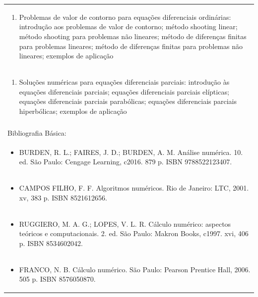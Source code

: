\documentclass[11pt]{article}
\begin{document}
\begin{center}
\begin{longtable}{|p{4cm}|p{4cm}|p{4cm}|p{4cm}|}
\multicolumn{4}{|p{\dimexpr 16cm + 6\tabcolsep\relax}|}{\begin{enumerate}[start=2]\item Problemas de valor de contorno para equações diferenciais ordinárias: introdução aos problemas de valor de contorno; método shooting linear; método shooting para problemas não lineares; método de diferenças finitas para problemas lineares; método de diferenças finitas para problemas não lineares; exemplos de aplicação\end{enumerate}}\\
\multicolumn{4}{|p{\dimexpr 16cm + 6\tabcolsep\relax}|}{\begin{enumerate}[start=3]\item Soluções numéricas para equações diferenciais parciais: introdução às equações diferenciais parciais; equações diferenciais parciais elípticas; equações diferenciais parciais parabólicas; equações diferenciais parciais hiperbólicas; exemplos de aplicação\end{enumerate}}\\
\multicolumn{4}{|p{\dimexpr 16cm + 6\tabcolsep\relax}|}{}\\
\hline
\multicolumn{4}{|p{16cm}|}{Bibliografia Básica:}\\*
\multicolumn{4}{|p{\dimexpr 16cm + 6\tabcolsep\relax}|}{\begin{itemize}\item BURDEN, R. L.; FAIRES, J. D.; BURDEN, A. M. Análise numérica. 10. ed. São Paulo: Cengage Learning, c2016. 879 p. ISBN 9788522123407.\end{itemize}}\\
\multicolumn{4}{|p{\dimexpr 16cm + 6\tabcolsep\relax}|}{\begin{itemize}\item CAMPOS FILHO, F. F. Algoritmos numéricos. Rio de Janeiro: LTC, 2001. xv, 383 p. ISBN 8521612656.\end{itemize}}\\
\multicolumn{4}{|p{\dimexpr 16cm + 6\tabcolsep\relax}|}{\begin{itemize}\item RUGGIERO, M. A. G.; LOPES, V. L. R. Cálculo numérico: aspectos teóricos e computacionais. 2. ed. São Paulo: Makron Books, c1997. xvi, 406 p. ISBN 8534602042.\end{itemize}}\\
\multicolumn{4}{|p{\dimexpr 16cm + 6\tabcolsep\relax}|}{\begin{itemize}\item FRANCO, N. B. Cálculo numérico. São Paulo: Pearson Prentice Hall, 2006. 505 p. ISBN 8576050870.\end{itemize}}\\

\end{longtable}
\end{center}
\end{document}
